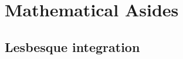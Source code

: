 \chapter{Mathematical Asides}
\label{chap:MA}

\section{Lesbesque integration}
\label{sec:MA:lesbesque}
